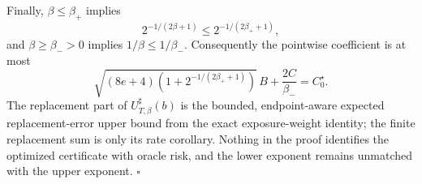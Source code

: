 Finally, \(\beta\le\beta_+\) implies
\[
2^{-1/(2\beta+1)}\le2^{-1/(2\beta_++1)},
\]
and \(\beta\ge\beta_->0\) implies \(1/\beta\le1/\beta_-\). Consequently the pointwise coefficient is at most
\[
\sqrt{(8e+4)\left(1+2^{-1/(2\beta_++1)}\right)}\,B+\frac{2C}{\beta_-}=C_0^\star.
\]
The replacement part of \(U_{T,\beta}^{\sharp}(b)\) is the bounded, endpoint-aware expected replacement-error upper bound from the exact exposure-weight identity; the finite replacement sum is only its rate corollary. Nothing in the proof identifies the optimized certificate with oracle risk, and the lower exponent remains unmatched with the upper exponent. \(\square\)